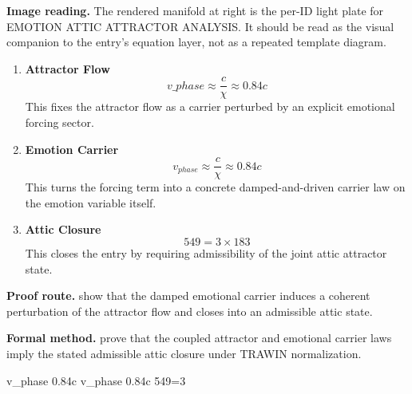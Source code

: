 \begin{samepage}
\noindent\begin{minipage}[t]{0.45\linewidth}
\vspace{0pt}
\raggedright
\scriptsize\textbf{Image reading.} The rendered manifold at right is the per-ID light plate for EMOTION ATTIC ATTRACTOR ANALYSIS. It should be read as the visual companion to the entry's equation layer, not as a repeated template diagram.\par
\end{minipage}\hfill
\begin{minipage}[t]{0.53\linewidth}
\vspace*{-0.10in}
\raggedright
{}
\end{minipage}
\end{samepage}

\clearpage


\begin{enumerate}[leftmargin=1.6em,itemsep=9pt,topsep=6pt]
\item \textbf{Attractor Flow}
\[
v\_{phase} \approx \frac{c}{\chi} \approx 0.84c
\]
This fixes the attractor flow as a carrier perturbed by an explicit emotional forcing sector.

\item \textbf{Emotion Carrier}
\[
v_{phase} \approx \frac{c}{\chi} \approx 0.84c
\]
This turns the forcing term into a concrete damped-and-driven carrier law on the emotion variable itself.

\item \textbf{Attic Closure}
\[
549=3\times183
\]
This closes the entry by requiring admissibility of the joint attic attractor state.
\end{enumerate}

\textbf{Proof route.} show that the damped emotional carrier induces a coherent perturbation of the attractor flow and closes into an admissible attic state.

\textbf{Formal method.} prove that the coupled attractor and emotional carrier laws imply the stated admissible attic closure under TRAWIN normalization.

\medskip
{}

\begin{tzpsnapshot}
\end{tzpsnapshot}

\tzpequationlinks
  {v\_{phase} \approx {} \approx 0.84c}
  {v_{phase} \approx {} \approx 0.84c}
  {549=3}
